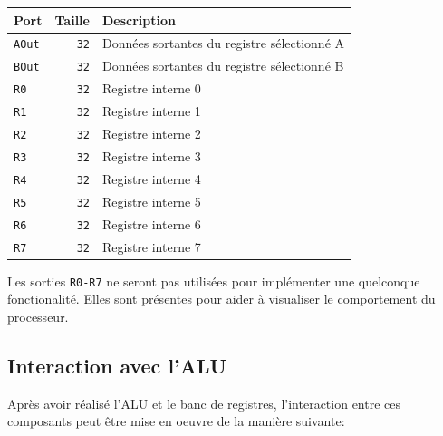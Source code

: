 \documentclass{article}
\begin{document}
    \begin{tabular}{|l|r|l|}
        \hline
        \textbf{Port} & \textbf{Taille} & \textbf{Description}                        \\
        \hline

        \texttt{AOut} & \texttt{32}     & Données sortantes du registre sélectionné A \\
        \hline
        \texttt{BOut} & \texttt{32}     & Données sortantes du registre sélectionné B \\
        \hline
        \texttt{R0}   & \texttt{32}     & Registre interne 0                          \\
        \hline
        \texttt{R1}   & \texttt{32}     & Registre interne 1                          \\
        \hline
        \texttt{R2}   & \texttt{32}     & Registre interne 2                          \\
        \hline
        \texttt{R3}   & \texttt{32}     & Registre interne 3                          \\
        \hline
        \texttt{R4}   & \texttt{32}     & Registre interne 4                          \\
        \hline
        \texttt{R5}   & \texttt{32}     & Registre interne 5                          \\
        \hline
        \texttt{R6}   & \texttt{32}     & Registre interne 6                          \\
        \hline
        \texttt{R7}   & \texttt{32}     & Registre interne 7                          \\

        \hline
    \end{tabular}

    Les sorties \texttt{R0-R7} ne seront pas utilisées pour implémenter une quelconque fonctionalité.
    Elles sont présentes pour aider à visualiser le comportement du processeur.

    \subsection{Interaction avec l'ALU}

    Après avoir réalisé l'ALU et le banc de registres, l'interaction entre ces composants peut être mise en oeuvre de la manière suivante:
\end{document}
